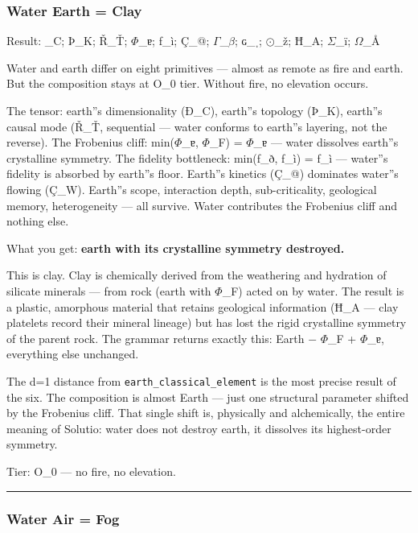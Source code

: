 \documentclass[12pt,a4paper]{article}
\begin{document}
\subsubsection{Water \otimes Earth = Clay}

Result: \_C; Þ\_K; Ř\_Ť; $\Phi$\_ɐ; ƒ\_ì; Ç\_@; $\Gamma$\_$\beta$; ɢ\_ˌ; $\odot$\_ž; Ħ\_A; $\Sigma$\_ï; $\Omega$\_Å\rangle

Water and earth differ on eight primitives --- almost as remote as fire and earth. But the composition stays at O\_0 tier. Without fire, no elevation occurs.

The tensor: earth''s dimensionality (Ð\_C), earth''s topology (Þ\_K), earth''s causal mode (Ř\_Ť, sequential --- water conforms to earth''s layering, not the reverse). The Frobenius cliff: min($\Phi$\_ɐ, $\Phi$\_F) = $\Phi$\_ɐ --- water dissolves earth''s crystalline symmetry. The fidelity bottleneck: min(ƒ\_ð, ƒ\_ì) = ƒ\_ì --- water''s fidelity is absorbed by earth''s floor. Earth''s kinetics (Ç\_@) dominates water''s flowing (Ç\_W). Earth''s scope, interaction depth, sub-criticality, geological memory, heterogeneity --- all survive. Water contributes the Frobenius cliff and nothing else.

What you get: \textbf{earth with its crystalline symmetry destroyed.}

This is clay. Clay is chemically derived from the weathering and hydration of silicate minerals --- from rock (earth with $\Phi$\_F) acted on by water. The result is a plastic, amorphous material that retains geological information (Ħ\_A --- clay platelets record their mineral lineage) but has lost the rigid crystalline symmetry of the parent rock. The grammar returns exactly this: Earth $-$ $\Phi$\_F + $\Phi$\_ɐ, everything else unchanged.

The d=1 distance from \texttt{earth\_classical\_element} is the most precise result of the six. The composition is almost Earth --- just one structural parameter shifted by the Frobenius cliff. That single shift is, physically and alchemically, the entire meaning of Solutio: water does not destroy earth, it dissolves its highest-order symmetry.

Tier: O\_0 --- no fire, no elevation.

\begin{center}
\rule{0.5\textwidth}{0.4pt}
\end{center}

\subsubsection{Water \otimes Air = Fog}
\end{document}
